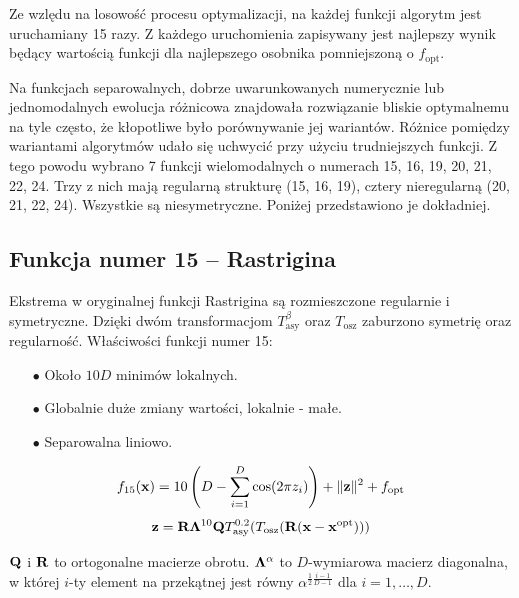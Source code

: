 \documentclass[a4paper,onecolumn,oneside,12pt,wide,floatssmall]{mwrep}
\newcommand{\norm}[1]{\lVert#1\rVert}
\theoremstyle{definition}
\theoremstyle{plain}%
\theoremstyle{remark}
\begin{document}
Ze wzlędu na losowość procesu optymalizacji, na każdej funkcji algorytm jest uruchamiany 15 razy.
Z każdego uruchomienia zapisywany jest najlepszy wynik będący wartością funkcji dla najlepszego osobnika
pomniejszoną o $f_\text{opt}$.

Na funkcjach separowalnych, dobrze uwarunkowanych numerycznie lub jednomodalnych ewolucja różnicowa znajdowała rozwiązanie
bliskie optymalnemu na tyle często, że kłopotliwe było porównywanie jej wariantów. 
Różnice pomiędzy wariantami algorytmów udało się uchwycić przy użyciu trudniejszych funkcji.
Z tego powodu wybrano 7 funkcji 
wielomodalnych o numerach 15, 16, 19, 20, 21, 22, 24. Trzy z nich mają regularną strukturę (15, 16, 19), 
cztery nieregularną (20, 21, 22, 24). Wszystkie są niesymetryczne.
Poniżej przedstawiono je dokładniej.

\subsection{Funkcja numer 15 -- Rastrigina}

Ekstrema w oryginalnej funkcji Rastrigina są rozmieszczone regularnie i symetryczne. Dzięki dwóm transformacjom $T^\beta_\text{asy}$ 
oraz $T_\text{osz}$ zaburzono symetrię oraz regularność. Właściwości funkcji numer 15: 
\begin{itemize}
 \item[$\bullet$] Około $10D$ minimów lokalnych.
 \item[$\bullet$] Globalnie duże zmiany wartości, lokalnie - małe.
 \item[$\bullet$] Separowalna liniowo.
\end{itemize} 

$$ f_{15}(\bold{x}) = 10 \left( D - \sum^D_{i=1}\cos(2 \pi z_i) \right) + \norm{\bold{z}}^2 + f_\text{opt} $$
$$ \bold{z} = \bold{R} \bold{\Lambda}^{10} \bold{Q} T^{0.2}_\text{asy}(T_\text{osz}(\bold{R}(\bold{x} - \bold{x}^\text{opt}))) $$ 

$\bold{Q}$ i $\bold{R}$ to ortogonalne macierze obrotu.
$\bold{\Lambda}^\alpha$ to $D$-wymiarowa macierz diagonalna, w której $i$-ty element na przekątnej jest równy 
$\alpha^{\frac{1}{2}\frac{i-1}{D-1}}$ dla $i = 1, \dots, D$.
\end{document}
